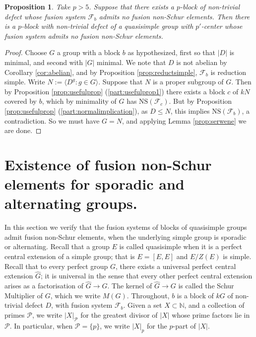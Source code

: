 \documentclass{amsart}
\theoremstyle{plain}\newtheorem{theorem}{Theorem}[section]
\theoremstyle{plain}\newtheorem{conjecture}[theorem]{Conjecture}
\theoremstyle{plain}\newtheorem{corollary}[theorem]{Corollary}
\theoremstyle{plain}\newtheorem{lemma}[theorem]{Lemma}
\theoremstyle{plain}\newtheorem{proposition}[theorem]{Proposition}
\theoremstyle{plain}\newtheorem{statement}[theorem]{}
\theoremstyle{definition}\newtheorem{definition}[theorem]{Definition}
\theoremstyle{definition}\newtheorem{example}[theorem]{Example}
\theoremstyle{definition}\newtheorem{examples}[theorem]{Examples}
\theoremstyle{definition}\newtheorem{notation}[theorem]{Notation}
\theoremstyle{definition}\newtheorem{remark}[theorem]{Remark}
\theoremstyle{definition}\newtheorem{remarks}[theorem]{Remarks}
\theoremstyle{definition}\newtheorem{question}[theorem]{Question}
\theoremstyle{definition}\newtheorem{propositiondefinition}[theorem]{Definition/Proposition}
\begin{document}
\begin{proposition}\label{prop:quasisimple} Take $p>5$. Suppose that there exists a $p$-block of non-trivial defect whose fusion system $\mathcal{F}_b$ admits no fusion non-Schur elements. Then there is a $p$-block with non-trivial defect of a quasisimple group with $p'$-center whose fusion system admits no fusion non-Schur elements.
\end{proposition}
\begin{proof}
    Choose $G$ a group with a block $b$ as hypothesized, first so that $|D|$ is minimal, and second with $|G|$ minimal. We note that $D$ is not abelian by Corollary \ref{cor:abelian}, and by Proposition \ref{prop:reductsimple}, $\mathcal{F}_b$ is reduction simple. 
     Write $N:= \langle D^g: g \in G\rangle$.  Suppose that $N$ is a proper subgroup of $G$. Then by Proposition \ref{prop:usefulprop} (\ref{part:usefulprop1}) there exists a block $c$ of $kN$ covered by $b$, which by minimality of $G$ has $\mathrm{NS}(\mathcal{F}_c)$. But by Proposition \ref{prop:usefulprop} (\ref{part:normalimplication}), as $D \leq N$, this implies $\mathrm{NS}(\mathcal{F}_b)$, a contradiction. So we must have $G = N$, and applying Lemma \ref{prop:serwene} we are done.  
\end{proof}
 \section{Existence of fusion non-Schur elements for sporadic and alternating groups.}
 In this section we verify that the fusion systems of blocks of quasisimple groups admit fusion non-Schur elements, when the underlying simple group is sporadic or alternating. Recall that a group $E$ is called quasisimple when it is a perfect central extension of a simple group; that is $E = [E,E]$ and $E/Z(E)$ is simple. Recall that to every perfect group $G$, there exists a universal perfect central extension $\hat{G}$; it is universal in the sense that every other perfect central extension arises as a factorisation of $\hat{G} \rightarrow G$. The kernel of $\hat{G} \rightarrow G$ is called the Schur Multiplier of $G$, which we write $M(G)$. Throughout, $b$ is a block of $kG$ of non-trivial defect $D$, with fusion system $\mathcal{F}_b$. Given a set $X \subset \mathbb{N}$, and a collection of primes $\mathcal{P}$, we write $|X|_{\mathcal{P}}$  for the greatest divisor of $|X|$ whose prime factors lie in $\mathcal{P}$. In particular, when $\mathcal{P} = \{p\}$, we write $|X|_p$ for the $p$-part of $|X|$.
\end{document}
